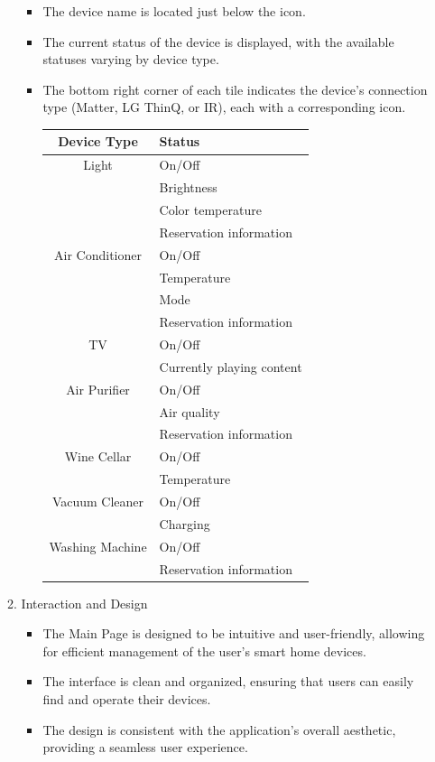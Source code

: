\documentclass[conference]{IEEEtran}
\begin{document}
\begin{enumerate}[label=\arabic*.]
\begin{enumerate}[label=\alph*.]
\begin{itemize}
\item The device name is located just below the icon.\\
\item The current status of the device is displayed, with the available statuses varying by device type.\\
\item The bottom right corner of each tile indicates the device's connection type (Matter, LG ThinQ, or IR), each with a corresponding icon.\\
\begin{table}[ht]
\setlength{\extrarowheight}{2.5pt}
\centering
\begin{tabular}{|c|l|}
\hline
\textbf{Device Type} & \textbf{Status} \\
\hline
Light & On/Off \\
 & Brightness \\
 & Color temperature \\
 & Reservation information \\
\hline
Air Conditioner & On/Off \\
 & Temperature \\
 & Mode \\
 & Reservation information \\
\hline
TV & On/Off \\
 & Currently playing content \\
\hline
Air Purifier & On/Off \\
 & Air quality \\
 & Reservation information \\
\hline
Wine Cellar & On/Off \\
 & Temperature \\
\hline
Vacuum Cleaner & On/Off \\
 & Charging \\
\hline
Washing Machine & On/Off \\
 & Reservation information \\
\hline
\end{tabular}
\end{table}

\end{itemize}

\item Interaction and Design\\
\begin{itemize}
\item The Main Page is designed to be intuitive and user-friendly, allowing for efficient management of the user's smart home devices.\\
\item The interface is clean and organized, ensuring that users can easily find and operate their devices.\\
\item The design is consistent with the application's overall aesthetic, providing a seamless user experience.\\
\end{itemize}
\end{enumerate}



\end{enumerate}
\end{document}
